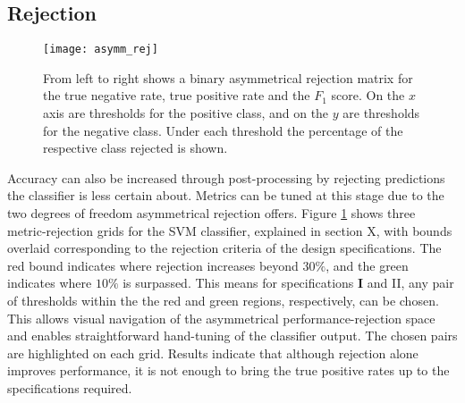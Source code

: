     \subsection{Rejection}
    \label{subsec:exp-postproc-rej}
        \begin{figure}[ht]
            \centering
            \texttt{[image: asymm\_rej]}
            \caption{From left to right shows a binary asymmetrical rejection matrix for the true negative rate, true positive rate and the $F_1$ score. On the $x$ axis are thresholds for the positive class, and on the $y$ are thresholds for the negative class. Under each threshold the percentage of the respective class rejected is shown.}
            \label{fig:exp-postproc-asymrej}
        \end{figure}
        Accuracy can also be increased through post-processing by rejecting predictions the classifier is less certain about. Metrics can be tuned at this stage due to the two degrees of freedom asymmetrical rejection offers. Figure \ref{fig:exp-postproc-asymrej} shows three metric-rejection grids for the SVM classifier, explained in section X, with bounds overlaid corresponding to the rejection criteria of the design specifications. The red bound indicates where rejection increases beyond $30\%$, and the green indicates where $10\%$ is surpassed. This means for specifications \textbf{I} and II, any pair of thresholds within the the red and green regions, respectively, can be chosen. This allows visual navigation of the asymmetrical performance-rejection space and enables straightforward hand-tuning of the classifier output. The chosen pairs are highlighted on each grid. Results indicate that although rejection alone improves performance, it is not enough to bring the true positive rates up to the specifications required.
    
